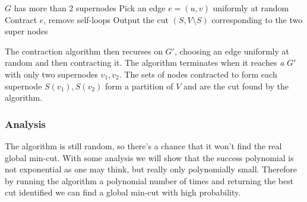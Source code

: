 \documentclass[../notes.tex]{subfiles}
\begin{document}
\begin{codebox}
\li \While $ G $ has more than 2 supernodes
\li Pick an edge $ e = (u,v) $ uniformly at random
\li Contract $ e $, remove self-loops
\li Output the cut $ (S, V \setminus S )$ corresponding to the two super nodes \End
\end{codebox}

The contraction algorithm then recurses on $ G' $, choosing an edge uniformly at random and then contracting it. 
The algorithm terminates when it reaches \textit{a} $ G' $ with only two supernodes $ v_1, v_2 $. 
The sets of nodes contracted to form each supernode $ S(v_1), S(v_2) $ form a partition of $ V $ and are the cut found by the algorithm.



\subsubsection{Analysis}

The algorithm is still random, so there's a chance that it won't find the real global min-cut. 
With some analysis we will show that the success polynomial is not exponential as one may think, but really only polynomially small.
Therefore by running the algorithm a polynomial number of times and returning the best cut identified we can find a global min-cut with high probability.
\end{document}
